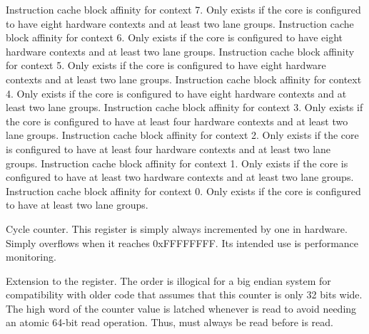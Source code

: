 Instruction cache block affinity for context 7. Only exists if the core is
configured to have eight hardware contexts and at least two lane groups.
Instruction cache block affinity for context 6. Only exists if the core is
configured to have eight hardware contexts and at least two lane groups.
Instruction cache block affinity for context 5. Only exists if the core is
configured to have eight hardware contexts and at least two lane groups.
Instruction cache block affinity for context 4. Only exists if the core is
configured to have eight hardware contexts and at least two lane groups.
Instruction cache block affinity for context 3. Only exists if the core is
configured to have at least four hardware contexts and at least two lane groups.
Instruction cache block affinity for context 2. Only exists if the core is
configured to have at least four hardware contexts and at least two lane groups.
Instruction cache block affinity for context 1. Only exists if the core is
configured to have at least two hardware contexts and at least two lane groups.
Instruction cache block affinity for context 0. Only exists if the core is
configured to have at least two lane groups.


Cycle counter. This register is simply always incremented by one in hardware.
Simply overflows when it reaches 0xFFFFFFFF. Its intended use is performance
monitoring.



Extension to the  register. The order is illogical for a big endian 
system for compatibility with older code that assumes that this counter is only 
32 bits wide. The high word of the counter value is latched whenever  
is read to avoid needing an atomic 64-bit read operation. Thus,  must 
always be read before  is read.



